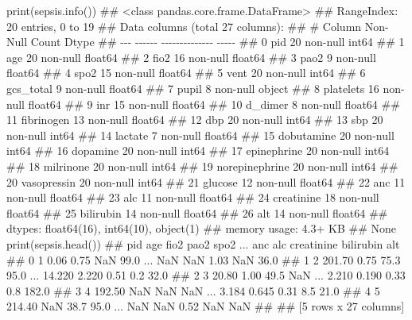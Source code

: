 \documentclass[
  letterpaper,
  DIV=11,
  numbers=noendperiod]{scrartcl}
\newenvironment{Shaded}{\begin{snugshade}}{\end{snugshade}}
\newcommand{\BuiltInTok}[1]{\textcolor[rgb]{0.00,0.23,0.31}{#1}}
\newcommand{\CommentTok}[1]{\textcolor[rgb]{0.37,0.37,0.37}{#1}}
\newcommand{\NormalTok}[1]{\textcolor[rgb]{0.00,0.23,0.31}{#1}}
\begin{document}
\begin{Shaded}
\begin{Highlighting}[]
\BuiltInTok{print}\NormalTok{(sepsis.info())}
\CommentTok{\#\# \textless{}class \textquotesingle{}pandas.core.frame.DataFrame\textquotesingle{}\textgreater{}}
\CommentTok{\#\# RangeIndex: 20 entries, 0 to 19}
\CommentTok{\#\# Data columns (total 27 columns):}
\CommentTok{\#\#  \#   Column          Non{-}Null Count  Dtype  }
\CommentTok{\#\# {-}{-}{-}  {-}{-}{-}{-}{-}{-}          {-}{-}{-}{-}{-}{-}{-}{-}{-}{-}{-}{-}{-}{-}  {-}{-}{-}{-}{-}  }
\CommentTok{\#\#  0   pid             20 non{-}null     int64  }
\CommentTok{\#\#  1   age             20 non{-}null     float64}
\CommentTok{\#\#  2   fio2            16 non{-}null     float64}
\CommentTok{\#\#  3   pao2            9 non{-}null      float64}
\CommentTok{\#\#  4   spo2            15 non{-}null     float64}
\CommentTok{\#\#  5   vent            20 non{-}null     int64  }
\CommentTok{\#\#  6   gcs\_total       9 non{-}null      float64}
\CommentTok{\#\#  7   pupil           8 non{-}null      object }
\CommentTok{\#\#  8   platelets       16 non{-}null     float64}
\CommentTok{\#\#  9   inr             15 non{-}null     float64}
\CommentTok{\#\#  10  d\_dimer         8 non{-}null      float64}
\CommentTok{\#\#  11  fibrinogen      13 non{-}null     float64}
\CommentTok{\#\#  12  dbp             20 non{-}null     int64  }
\CommentTok{\#\#  13  sbp             20 non{-}null     int64  }
\CommentTok{\#\#  14  lactate         7 non{-}null      float64}
\CommentTok{\#\#  15  dobutamine      20 non{-}null     int64  }
\CommentTok{\#\#  16  dopamine        20 non{-}null     int64  }
\CommentTok{\#\#  17  epinephrine     20 non{-}null     int64  }
\CommentTok{\#\#  18  milrinone       20 non{-}null     int64  }
\CommentTok{\#\#  19  norepinephrine  20 non{-}null     int64  }
\CommentTok{\#\#  20  vasopressin     20 non{-}null     int64  }
\CommentTok{\#\#  21  glucose         12 non{-}null     float64}
\CommentTok{\#\#  22  anc             11 non{-}null     float64}
\CommentTok{\#\#  23  alc             11 non{-}null     float64}
\CommentTok{\#\#  24  creatinine      18 non{-}null     float64}
\CommentTok{\#\#  25  bilirubin       14 non{-}null     float64}
\CommentTok{\#\#  26  alt             14 non{-}null     float64}
\CommentTok{\#\# dtypes: float64(16), int64(10), object(1)}
\CommentTok{\#\# memory usage: 4.3+ KB}
\CommentTok{\#\# None}
\BuiltInTok{print}\NormalTok{(sepsis.head())}
\CommentTok{\#\#    pid     age  fio2  pao2  spo2  ...     anc    alc creatinine  bilirubin    alt}
\CommentTok{\#\# 0    1    0.06  0.75   NaN  99.0  ...     NaN    NaN       1.03        NaN   36.0}
\CommentTok{\#\# 1    2  201.70  0.75  75.3  95.0  ...  14.220  2.220       0.51        0.2   32.0}
\CommentTok{\#\# 2    3   20.80  1.00  49.5   NaN  ...   2.210  0.190       0.33        0.8  182.0}
\CommentTok{\#\# 3    4  192.50   NaN   NaN   NaN  ...   3.184  0.645       0.31        8.5   21.0}
\CommentTok{\#\# 4    5  214.40   NaN  38.7  95.0  ...     NaN    NaN       0.52        NaN    NaN}
\CommentTok{\#\# }
\CommentTok{\#\# [5 rows x 27 columns]}
\end{Highlighting}
\end{Shaded}
\end{document}
